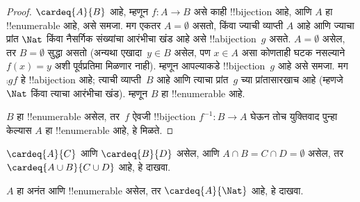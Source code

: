 \documentclass[../../../include/open-logic-section]{subfiles}
\begin{document}
\begin{proof}
$\cardeq{A}{B}$ आहे, म्हणून $f \colon A
\to B$ असे काही !!{bijection} आहे, आणि $A$ हा !!{enumerable} आहे,
असे समजा.
{
  मग एकतर $A  = \emptyset$ असतो, किंवा ज्याची व्याप्ती $A$ आहे आणि
  ज्याचा प्रांत $\Nat$ किंवा नैसर्गिक संख्यांचा आरंभीचा खंड आहे असे
  !!a{bijection}~$g$ असते. $A = \emptyset$ असेल, तर $B =
  \emptyset$ सुद्धा असतो (अन्यथा एखादा~$y \in B$ असेल, पण $x
  \in A$ असा कोणताही घटक नसल्याने $f(x) = y$ अशी पूर्वप्रतिमा मिळणार
  नाही). म्हणून आपल्याकडे !!{bijection}~$g$ आहे असे समजा. मग
  $\comp{g}{f}$ हे !!a{bijection} आहे; त्याची व्याप्ती~$B$ आहे आणि
  त्याचा प्रांत~$g$ च्या प्रांतासारखाच आहे (म्हणजे $\Nat$ किंवा त्याचा
  आरंभीचा खंड). म्हणून $B$ हा !!{enumerable} आहे.}
%
%

$B$ हा !!{enumerable} असेल, तर~$f$ ऐवजी
!!{bijection} $f^{-1}\colon B \to A$ घेऊन तोच युक्तिवाद पुन्हा केल्यास
$A$ हा !!{enumerable} आहे, हे मिळते.
\end{proof}

\begin{prob}
$\cardeq{A}{C}$ आणि $\cardeq{B}{D}$ असेल, आणि $A \cap B =
C \cap D = \emptyset$ असेल, तर $\cardeq{A \cup B}{C \cup D}$ आहे,
हे दाखवा.
\end{prob}

\begin{prob}
$A$ हा अनंत आणि !!{enumerable} असेल, तर $\cardeq{A}{\Nat}$ आहे, हे
दाखवा.
\end{prob}
\end{document}
